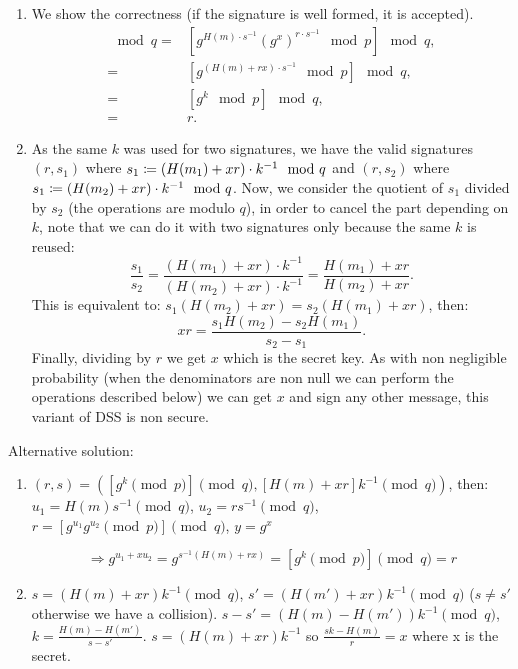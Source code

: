 \begin{solution}
	\begin{enumerate}
		\item We show the correctness (if the signature is well formed, it is accepted).
		\begin{align*}
			[g^{u_1} y^{u_2} \mod p] \mod q = &[g^{H(m)\cdot s^{-1}} (g^x)^{r
				\cdot s^{-1}} \mod p] \mod q,\\
			= &[g^{(H(m)+rx)	\cdot s^{-1}} \mod p] \mod q,\\
			= &[g^{k} \mod p] \mod q,\\
			= &r .
		\end{align*}

		\item As the same $k$ was used for two signatures, we have the valid signatures $(r,s_1)$ where $s_1 \coloneqq (H(m_1) + xr) \cdot k^{-1} \mod
		q$ and $(r,s_2)$ where $s_1 \coloneqq (H(m_2) + xr) \cdot k^{-1} \mod
		q$. Now, we consider the quotient of $s_1$ divided by $s_2$ (the operations are modulo $q$), in order to cancel the part depending on $k$, note that we can do it with two signatures only because the same $k$ is reused:
		\[\frac{s_1}{s_2}=\frac{(H(m_1) + xr) \cdot k^{-1}}{(H(m_2) + xr) \cdot k^{-1}}=\frac{H(m_1) + xr}{H(m_2) + xr} .\]
		This is equivalent to: $s_1 (H(m_2) + xr)= s_2 (H(m_1) + xr)$, then:
		\[xr= \frac{s_1 H(m_2) - s_2 H(m_1)}{s_2-s_1}.\]
		Finally, dividing by $r$ we get $x$ which is the secret key. As with non negligible probability (when the denominators are non null we can perform the operations described below) we can get $x$ and sign any other message, this variant of DSS is non secure.
	\end{enumerate}

	Alternative solution:

	\begin{enumerate}
		\item
		$(r, s) = ([g^k \pmod{p}] \pmod{q}, [H(m) + xr]k^{-1} \pmod{q})$, then:
		$u_1 = H(m)s^{-1} \pmod{q}$,  $u_2 = rs^{-1} \pmod{q}$, $r = [g^{u_1} g^{u_2} \pmod{p}] \pmod{q}$, $y = g^x$

		\[\Rightarrow g^{u_1 + xu_2} = g^{s^{-1}(H(m) + rx)} = [g^k \pmod{p}] \pmod{q} = r\]

		\item
		$s = (H(m) + xr)k^{-1} \pmod{q}$, $s' = (H(m') + xr)k^{-1} \pmod{q}$ ($s \neq s'$ otherwise we have a collision).
		$s - s' = (H(m) - H(m'))k^{-1} \pmod{q}$, $k = \frac{H(m) - H(m')}{s - s'}$.
		$s = (H(m) + xr)k^{-1}$ so $\frac{sk - H(m)}{r} = x$ where x is the secret.
	\end{enumerate}
\end{solution}



